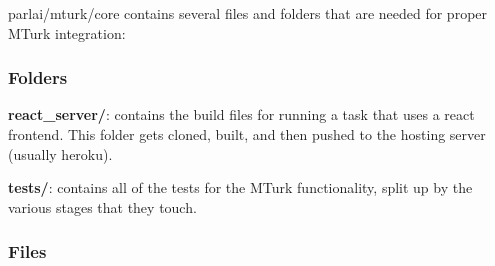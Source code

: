 {\ttfamily parlai/mturk/core} contains several files and folders that are needed for proper M\+Turk integration\+:

\subsubsection*{Folders}


\begin{DoxyItemize}
\item {\bfseries react\+\_\+server/}\+: contains the build files for running a task that uses a react frontend. This folder gets cloned, built, and then pushed to the hosting server (usually heroku).
\item {\bfseries tests/}\+: contains all of the tests for the M\+Turk functionality, split up by the various stages that they touch.
\end{DoxyItemize}

\subsubsection*{Files}


